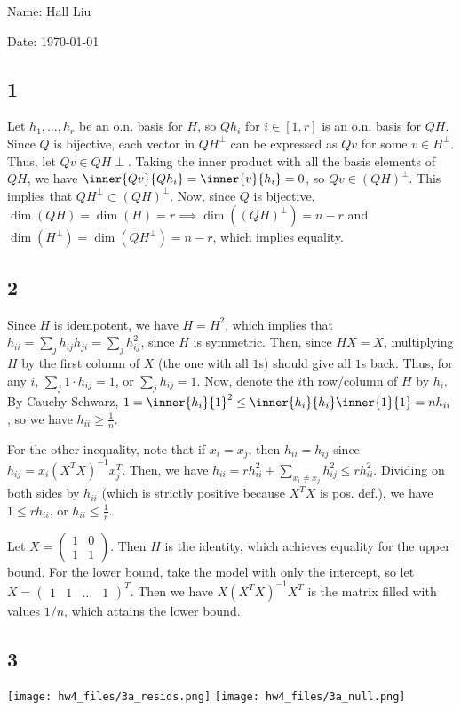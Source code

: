 \documentclass{article}
\newcommand{\openm}{\begin{pmatrix}}
\newcommand{\closem}{\end{pmatrix}}
\begin{document}
Name: Hall Liu

Date: \today 
\vspace{1.5cm}
\subsection*{1}
Let $h_1,\ldots,h_r$ be an o.n. basis for $H$, so $Qh_i$ for $i\in[1,r]$ is an o.n. basis for $QH$. Since $Q$ is bijective, each vector in $QH^\perp$ can be expressed as $Qv$ for some $v\in H^\perp$. Thus, let $Qv\in QH\perp$. Taking the inner product with all the basis elements of $QH$, we have $\inner{Qv}{Qh_i}=\inner{v}{h_i}=0$, so $Qv\in(QH)^\perp$. This implies that $QH^\perp\subset(QH)^\perp$. Now, since $Q$ is bijective, $\dim(QH)=\dim(H)=r\implies\dim((QH)^\perp)=n-r$ and $\dim(H^\perp)=\dim(QH^\perp)=n-r$, which implies equality.
\subsection*{2}
Since $H$ is idempotent, we have $H=H^2$, which implies that $h_{ii}=\sum_jh_{ij}h_{ji}=\sum_jh_{ij}^2$, since $H$ is symmetric. Then, since $HX=X$, multiplying $H$ by the first column of $X$ (the one with all $1$s) should give all $1$s back. Thus, for any $i$, $\sum_j1\cdot h_{ij}=1$, or $\sum_j h_{ij}=1$. Now, denote the $i$th row/column of $H$ by $h_i$. By Cauchy-Schwarz, $1=\inner{h_i}{1}^2\leq\inner{h_i}{h_i}\inner{1}{1}=nh_{ii}$, so we have $h_{ii}\geq\frac{1}{n}$.

For the other inequality, note that if $x_i=x_j$, then $h_{ii}=h_{ij}$ since $h_{ij}=x_i(X^TX)^{-1}x_j^T$. Then, we have $h_{ii}=rh_{ii}^2+\sum_{x_i\neq x_j}h_{ij}^2\leq rh_{ii}^2$. Dividing on both sides by $h_{ii}$ (which is strictly positive because $X^TX$ is pos. def.), we have $1\leq rh_{ii}$, or $h_{ii}\leq\frac{1}{r}$.

Let $X=\openm1&0\\1&1\closem$. Then $H$ is the identity, which achieves equality for the upper bound. 
For the lower bound, take the model with only the intercept, so let $X=\openm1&1&\hdots&1\closem^T$. Then we have $X(X^TX)^{-1}X^T$ is the matrix filled with values $1/n$, which attains the lower bound.
\subsection*{3}
\noindent\texttt{[image: hw4\_files/3a\_resids.png]}
\texttt{[image: hw4\_files/3a\_null.png]}
\end{document}
